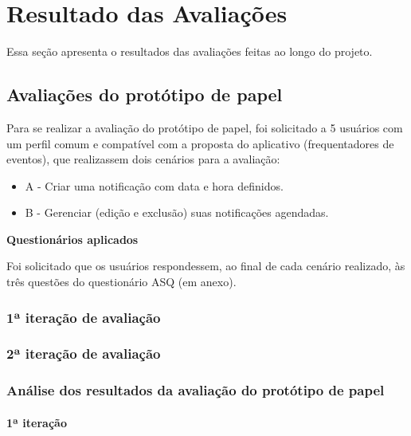\chapter{Resultado das Avaliações}
  
  Essa seção apresenta o resultados das avaliações feitas ao longo do projeto.
  
  \section{Avaliações do protótipo de papel}
     
     Para se realizar a avaliação do protótipo de papel, foi solicitado a 5 usuários com um perfil comum
     e compatível com a proposta do aplicativo (frequentadores de eventos), que realizassem dois cenários para a avaliação:
  
    \begin{itemize}
	\item A - Criar uma notificação com data e hora definidos.
	\item B - Gerenciar (edição e exclusão) suas notificações agendadas.
    \end{itemize}
     
    \noindent
    \textbf{Questionários aplicados}
    
      Foi solicitado que os usuários respondessem, ao final de cada cenário realizado, às três questões do
      questionário ASQ (em anexo).            
  
    \subsection{1ª iteração de avaliação}
        
        
    
    \pagebreak
    \subsection{2ª iteração de avaliação}
	
	
  
    \pagebreak
  \subsection{Análise dos resultados da avaliação do protótipo de papel}
    
    \subsubsection{1ª iteração}
      

